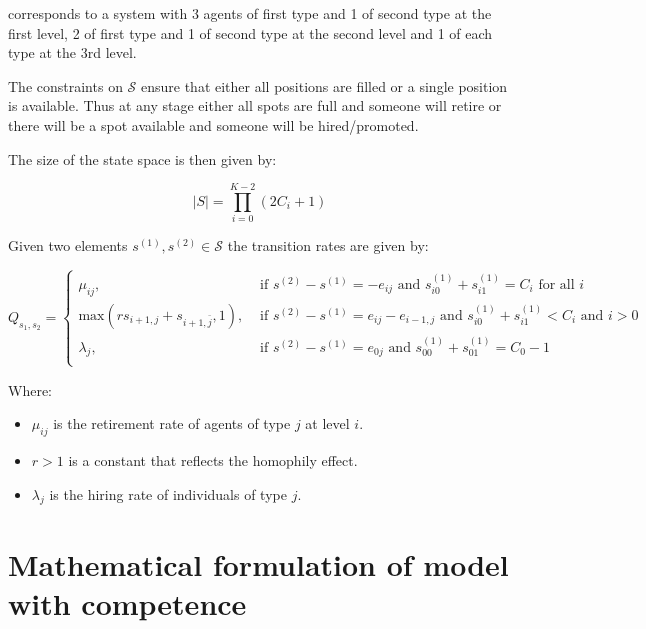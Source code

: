 \documentclass{article}
\renewcommand{\S}{\mathcal{S}}
\begin{document}
corresponds to a system with 3 agents of first type and 1 of second type at the
first level, 2 of first type and 1 of second type at the second level and 1 of
each type at the 3rd level.

The constraints on \(\S\) ensure that either all positions are filled or a
single position is available. Thus at any stage either all spots are full and
someone will retire or there will be a spot available and someone will be
hired/promoted.

The size of the state space is then given by:

\begin{equation}
    |S| = \prod_{i=0}^{K - 2}\left(2C_i + 1\right)
\end{equation}

Given two elements \(s^{(1)}, s^{(2)}\in \S\) the transition rates are given by:

\begin{equation}\label{eqn:transition_rates}
    Q_{s_1, s_2} =
        \begin{cases}
            \mu_{ij},& \text{ if }s^{(2)} - s^{(1)} = -e_{ij}
            \text{ and }s^{(1)}_{i0} + s^{(1)}_{i1} = C_i\text{ for all }i\\
           \text{max}(rs_{i + 1,j} + s_{i + 1, \bar j}, 1),& \text{ if }s^{(2)} - s^{(1)} = e_{ij} - e_{i-1, j}
                                     \text{ and }s^{(1)}_{i0} + s^{(1)}_{i1} < C_{i}
                                     \text{ and }i > 0\\
           \lambda_{j},&\text{ if }s^{(2)} - s^{(1)} = e_{0j}
                        \text{ and }s^{(1)}_{00} + s^{(1)}_{01} = C_{0} - 1\\
        \end{cases}
\end{equation}

Where:

\begin{itemize}
    \item \(\mu_{ij}\) is the retirement rate of agents of type \(j\) at level
        \(i\).
    \item \(r > 1\) is a constant that reflects the homophily effect.
    \item \(\lambda_j\) is the hiring rate of individuals of type \(j\).
\end{itemize}


\section{Mathematical formulation of model with competence}
\end{document}
